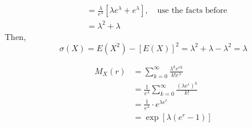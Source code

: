 \documentclass[UTF8]{article}
\begin{document}
\begin{enumerate}
\begin{equation*}
\begin{split}
                    &=\frac{\lambda}{e^\lambda}[\lambda e^\lambda+e^\lambda],\quad\text{use the facts before}\\
                    &=\lambda^2+\lambda
                \end{split}
            \end{equation*}
        Then,
        \begin{equation*}
            \sigma(X)=E(X^2)-[E(X)]^2=\lambda^2+\lambda-\lambda^2=\lambda
        \end{equation*}
        
        \begin{equation*}
            \begin{split}
                M_X(r) &=\sum^\infty_{k=0}\frac{\lambda^k e^{rk}}{k!e^\lambda}\\
                &=\frac{1}{e^\lambda}\sum^\infty_{k=0}\frac{(\lambda e^r)^k}{k!}\\
                &=\frac{1}{e^\lambda}\cdot e^{\lambda e^r}\\
                &=\exp[\lambda(e^r-1)]
            \end{split}
        \end{equation*}
    \end{enumerate}
\end{document}
